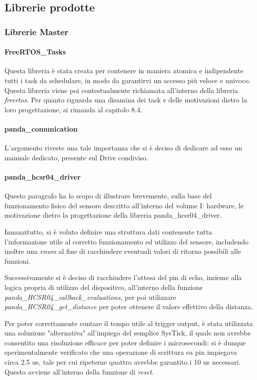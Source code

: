 \documentclass{article}
\begin{document}
    \subsection{Librerie prodotte}
        \subsubsection{Librerie Master}
          \paragraph{FreeRTOS\_Tasks} Questa libreria è stata creata per contenere in maniera atomica e indipendente tutti i task da schedulare, in modo da garantirvi un accesso più veloce e univoco. Questa libreria viene poi contestualmente richiamata all'interno della libreria \textit{freertos}. Per quanto riguarda una disamina dei task e delle motivazioni dietro la loro progettazione, si rimanda al capitolo 8.4. 
          \paragraph{panda\_comunication} L'argomento riveste una tale importanza che si è deciso di dedicare ad esso un manuale dedicato, presente sul Drive condiviso.
          \paragraph{panda\_hcsr04\_driver}
          Questo paragrafo ha lo scopo di illustrare brevemente, sulla base del funzionamento fisico del sensore descritto all'interno del volume I: hardware, le motivazione dietro la progettazione della libreria panda\_hcsr04\_driver. 

          Innanzitutto, si è voluto definire una struttura dati contenente tutta l'informazione utile al corretto funzionamento ed utilizzo del sensore, includendo inoltre una \textit{enum} al fine di racchiudere eventuali valori di ritorno possibili alle funzioni.

          Successivamente si è deciso di racchiudere l'attesa del pin di echo, insieme alla logica propria di utilizzo del dispositivo, all'interno della funzione \textit{panda\_HCSR04\_callback\_evaluations}, per poi utilizzare \textit{panda\_HCSR04\_get\_distance} per poter ottenere il valore effettivo della distanza. 

          Per poter correttamente contare il tempo utile al trigger output, è stata utilizzata una soluzione "alternativa" all'impiego del semplice SysTick, il quale non avrebbe consentito una risoluzione efficace per poter definire i microsecondi: si è dunque sperimentalmente verificato che una operazione di scrittura su pin impiegava circa 2.5 us, tale per cui ripeterne quattro avrebbe garantito i 10 us necessari. Questo avviene all'interno della funzione di \textit{reset}.  
\end{document}
